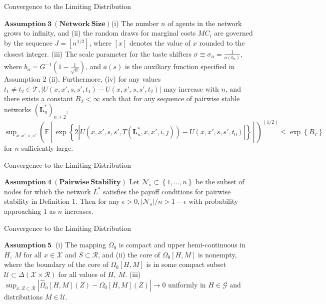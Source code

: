 \documentclass{beamer}		%
\begin{document}
\begin{frame}{Convergence to the Limiting Distribution}

$\bm{Assumption\ 3\ (Network\ Size)}$(i) The number $n$ of agents in the network grows to infinity, and (ii) the random draws for marginal costs $MC_i$ are governed by the sequence $J=[n^{1/2}]$, where $[x]$ denotes the value of $x$ rounded to the closest integer. (iii) The scale parameter for the taste shifters $\sigma \equiv \sigma_n = \frac{1}{a(b_n)}$, where $b_n = G^{-1} (1-\frac{1}{\sqrt{n}})$, and $a(s)$ is the auxiliary function specified in Assumption 2 (ii). Furthermore, (iv) for any values $t_1 \ne t_2 \in \mathcal{T}, |U(x,x',s,s',t_1)-U(x,x',s,s',t_2)|$ may increase with $n$, and there exists a constant $B_T < \infty$ such that for any sequence of pairwise stable networks $(\bm{L}_n^*)_{n \ge 2}$, $\sup_{x,x',s,s'} \left( \mathbb{E}[\exp \left\{ 2|U(x,x',s,s',T(\bm{L}_n^*,x,x',i,j)) - U(x,x',s,s',t_0)| \right\}] \right)^(1/2) \leq \exp \left\{ B_T \right\}$ for $n$ sufficiently large.




\end{frame}







\begin{frame}{Convergence to the Limiting Distribution}

$\bm{Assumption\ 4\ (Pairwise\ Stability)}$ Let $\mathcal{N}_s \subset \left\{ 1,\ldots, n  \right\}$ be the subset of nodes for which the network $L^*$ satisfies the payoff conditions for pairwise stability in Definition 1. Then for any $\epsilon > 0, |\mathcal{N}_s|/n > 1 - \epsilon$ with probability approaching 1 as $n$ increases.




\end{frame}








\begin{frame}{Convergence to the Limiting Distribution}

$\bm{Assumption\ 5\ }$  (i) The mapping $\Omega_0$ is compact and upper hemi-continuous in $H,\ M$ for all $x \in \mathcal{X} $ and $S \subset \mathcal{R}$, and (ii) the core of $\Omega_0[H,M]$ is nonempty, where the boundary of the core of $\Omega_0[H,M]$ is in some compact subset $\mathcal{U} \subset \Delta (\mathcal{X} \times \mathcal{R})$ for all values of $H,\ M$. (iii)
$\sup_{x, Z \subset \mathcal{R}} |\hat{\Omega}_n[H,M](Z) - \Omega_0[H,M](Z)| \to 0$ uniformly in $H \in \mathcal{G}$ and distributions $M \in \mathcal{U}$.




\end{frame}
\end{document}
